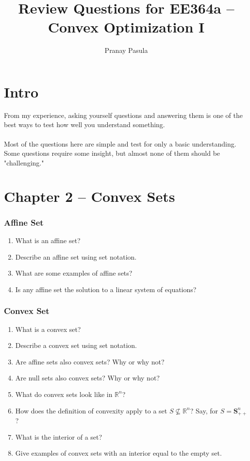 \documentclass[]{article}
\title{Review Questions for EE364a -- Convex Optimization I}
\author{Pranay Pasula}
\newcommand{\Rn}{\mathbb{R}^{n}}
\newcommand{\Snpp}{\boldsymbol{S}^{n}_{++}}
\newcounter{q}
\begin{document}
\maketitle

\section*{Intro}
From my experience, asking yourself questions and answering them is one of the best ways to test how well you understand something. 
\\\\
Most of the questions here are simple and test for only a basic understanding. Some questions require some insight, but almost none of them should be "challenging."
\\
\section*{Chapter 2 -- Convex Sets}

\subsubsection*{Affine Set}

\begin{enumerate}
 \item What is an affine set?
 \item Describe an affine set using set notation.
 \item What are some examples of affine sets?
 \item Is any affine set the solution to a linear system of equations?
\end{enumerate}

\subsubsection*{Convex Set}

\begin{enumerate}[resume*]
\item What is a convex set? 
\item Describe a convex set using set notation. 
\item Are affine sets also convex sets? Why or why not? 
\item Are null sets also convex sets? Why or why not? 
\item What do convex sets look like in $\Rn$? 
\item How does the definition of convexity apply to a set $S \nsubseteq \Rn$? Say, for $S = \Snpp$? 
\item What is the interior of a set? 
\item Give examples of convex sets with an interior equal to the empty set.
\end{enumerate}
\end{document}
